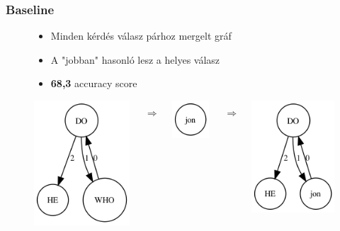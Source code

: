 \documentclass[bigger]{beamer}
\begin{document}
\begin{frame}
    \frametitle{Baseline}
    \begin{figure}
        \centering
        \small
            \begin{itemize}
				\item Minden kérdés válasz párhoz mergelt gráf
				\item A "jobban" hasonló lesz a helyes válasz
				\item \textbf{68,3} accuracy score
			\end{itemize}
            \begin{columns}
				\begin{column}{0.2\textwidth}
					\pause \includegraphics[scale=0.5]{pics/didit.png}
				\end{column}
				\begin{column}{0.2\textwidth}
				\pause \[\Rightarrow\]
				\end{column}
				\begin{column}{0.2\textwidth}
					\pause \includegraphics[scale=0.5]{pics/jon.png}
				\end{column}
				\begin{column}{0.2\textwidth}
					\pause \[\Rightarrow\]
				\end{column}
				\begin{column}{0.3\textwidth}
				\pause \includegraphics[scale=0.5]{pics/jondid.png}
				\end{column}
			\end{columns}
        \label{fig:method}
        \end{figure}
\end{frame}
\end{document}
